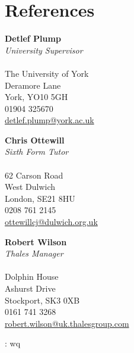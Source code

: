 \documentclass[11pt, a4paper]{cv}
\begin{document}
\begin{minipage}[t]{0.8\textwidth}
\sectionspace %

\section{References}

\begin{minipage}[t]{0.33\textwidth}
\textbf{Detlef Plump} \\
\textit{University Supervisor} \\
\\
The University of York \\
Deramore Lane \\
York, YO10 5GH \\
01904 325670 \\
\href{mailto:detlef.plump@york.ac.uk}{detlef.plump@york.ac.uk}
\end{minipage}
\begin{minipage}[t]{0.33\textwidth}
\textbf{Chris Ottewill} \\
\textit{Sixth Form Tutor} \\
\\
62 Carson Road \\
West Dulwich \\
London, 
SE21 8HU \\
0208 761 2145 \\
\href{mailto:ottewillcj@dulwich.org.uk}{ottewillcj@dulwich.org.uk}
\end{minipage}
\begin{minipage}[t]{0.33\textwidth}
\textbf{Robert Wilson} \\
\textit{Thales Manager} \\
\\
Dolphin House \\
Ashurst Drive \\
Stockport, 
SK3 0XB \\
0161 741 3268 \\
\href{mailto:robert.wilson@uk.thalesgroup.com}{robert.wilson@uk.thalesgroup.com}
\end{minipage}

\end{minipage}

\vfill

{}
\scriptsize\flushright: wq
\end{document}
